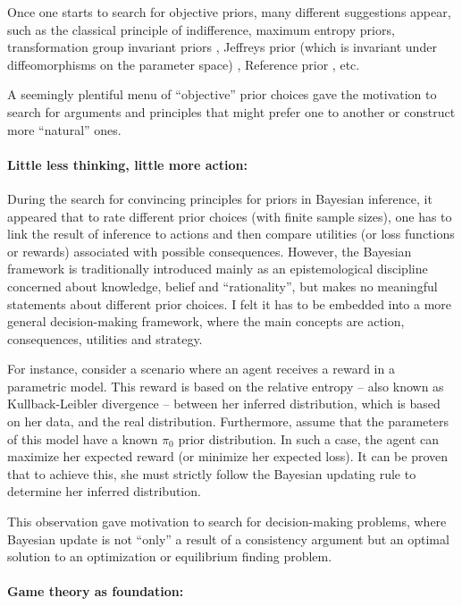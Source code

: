 \documentclass{article}
\theoremstyle{definition}
\begin{document}
Once one starts to search for objective priors, many different suggestions appear, such as the classical principle of indifference, maximum entropy priors, transformation group invariant priors \cite{book:Jaynes}, Jeffreys prior (which is invariant under diffeomorphisms on the parameter space) \cite{book:Jaynes,paper:InformationGeometry,paper:JeffreysPriorOriginal}, Reference prior \cite{paper:ReferencePrior,book:Bernardo}, etc.

A seemingly plentiful menu of ``objective'' prior choices gave the motivation to search for arguments and principles that might prefer one to another or construct more ``natural'' ones.

\paragraph{Little less thinking, little more action:}

During the search for convincing principles for priors in Bayesian inference, it appeared that to rate different prior choices (with finite sample sizes), one has to link the result of inference to actions and then compare utilities (or loss functions or rewards) associated with possible consequences.
However, the Bayesian framework is traditionally introduced mainly as an epistemological discipline concerned about knowledge, belief and ``rationality'', but makes no meaningful statements about different prior choices. I felt it has to be embedded into a more general decision-making framework, where the main concepts are action, consequences, utilities and strategy.


For instance, consider a scenario where an agent receives a reward in a parametric model. This reward is based on the relative entropy -- also known as Kullback-Leibler divergence -- between her inferred distribution, which is based on her data, and the real distribution. Furthermore, assume that the parameters of this model have a known $\pi_0$ prior distribution.
In such a case, the agent can maximize her expected reward (or minimize her expected loss). It can be proven that to achieve this, she must strictly follow the Bayesian updating rule to determine her inferred distribution.


This observation gave motivation to search for decision-making problems, where Bayesian update is not ``only'' a result of a consistency argument but an optimal solution to an optimization or equilibrium finding problem.


\paragraph{Game theory as foundation:}
\end{document}
